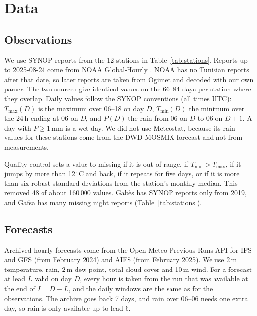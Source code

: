 \documentclass{article}
\begin{document}
\section{Data}
\label{sec:data}

\subsection{Observations}
We use SYNOP reports from the 12 stations in Table~\ref{tab:stations}. Reports up to 2025-08-24 come from NOAA Global-Hourly \citep{smith2011}. NOAA has no Tunisian reports after that date, so later reports are taken from Ogimet and decoded with our own parser. The two sources give identical values on the 66--84 days per station where they overlap. Daily values follow the SYNOP conventions (all times UTC): $T_{\max}(D)$ is the maximum over 06--18 on day $D$, $T_{\min}(D)$ the minimum over the 24\,h ending at 06 on $D$, and $P(D)$ the rain from 06 on $D$ to 06 on $D{+}1$. A day with $P\ge1$\,mm is a wet day. We did not use Meteostat, because its rain values for these stations come from the DWD MOSMIX forecast and not from measurements.

Quality control sets a value to missing if it is out of range, if $T_{\min}>T_{\max}$, if it jumps by more than 12\,$^\circ$C and back, if it repeats for five days, or if it is more than six robust standard deviations from the station's monthly median. This removed 48 of about 160\,000 values. Gab\`es has SYNOP reports only from 2019, and Gafsa has many missing night reports (Table~\ref{tab:stations}).

\begin{table}[t]
\caption{Stations, ordered from north to south, and number of valid observations between 2025-09-01 and 2026-10-25.}
\label{tab:stations}
\centering\small

\end{table}

\subsection{Forecasts}
Archived hourly forecasts come from the Open-Meteo Previous-Runs API \citep{openmeteo} for IFS and GFS (from February 2024) and AIFS (from February 2025). We use 2\,m temperature, rain, 2\,m dew point, total cloud cover and 10\,m wind. For a forecast at lead $L$ valid on day $D$, every hour is taken from the run that was available at the end of $I=D-L$, and the daily windows are the same as for the observations. The archive goes back 7 days, and rain over 06--06 needs one extra day, so rain is only available up to lead 6.
\end{document}
